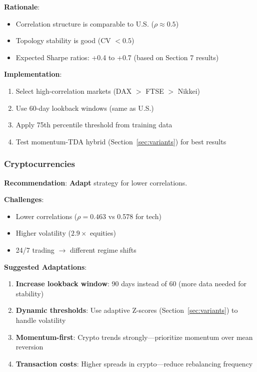 \textbf{Rationale}:
\begin{itemize}
\item Correlation structure is comparable to U.S. ($\rho \approx 0.5$)
\item Topology stability is good (CV $< 0.5$)
\item Expected Sharpe ratios: +0.4 to +0.7 (based on Section 7 results)
\end{itemize}

\textbf{Implementation}:
\begin{enumerate}
\item Select high-correlation markets (DAX $>$ FTSE $>$ Nikkei)
\item Use 60-day lookback windows (same as U.S.)
\item Apply 75th percentile threshold from training data
\item Test momentum-TDA hybrid (Section~\ref{sec:variants}) for best results
\end{enumerate}

\subsubsection{Cryptocurrencies}

\textbf{Recommendation}: \textbf{Adapt} strategy for lower correlations.

\textbf{Challenges}:
\begin{itemize}
\item Lower correlations ($\rho = 0.463$ vs 0.578 for tech)
\item Higher volatility ($2.9\times$ equities)
\item 24/7 trading $\rightarrow$ different regime shifts
\end{itemize}

\textbf{Suggested Adaptations}:
\begin{enumerate}
\item \textbf{Increase lookback window}: 90 days instead of 60 (more data needed for stability)
\item \textbf{Dynamic thresholds}: Use adaptive Z-scores (Section~\ref{sec:variants}) to handle volatility
\item \textbf{Momentum-first}: Crypto trends strongly---prioritize momentum over mean reversion
\item \textbf{Transaction costs}: Higher spreads in crypto---reduce rebalancing frequency
\end{enumerate}

